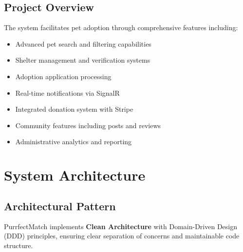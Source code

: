 \documentclass[12pt,a4paper]{article}
\begin{document}
\subsection{Project Overview}

The system facilitates pet adoption through comprehensive features including:
\begin{itemize}
    \item Advanced pet search and filtering capabilities
    \item Shelter management and verification systems
    \item Adoption application processing
    \item Real-time notifications via SignalR
    \item Integrated donation system with Stripe
    \item Community features including posts and reviews
    \item Administrative analytics and reporting
\end{itemize}

\section{System Architecture}

\subsection{Architectural Pattern}

PurrfectMatch implements \textbf{Clean Architecture} with Domain-Driven Design (DDD) principles, ensuring clear separation of concerns and maintainable code structure.
\end{document}
